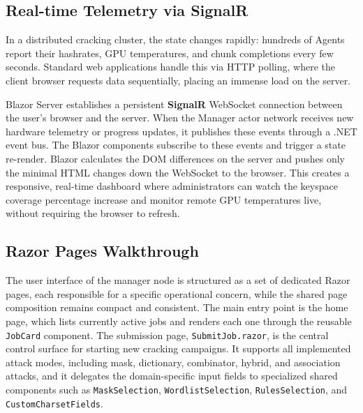 \subsection{Real-time Telemetry via SignalR}
In a distributed cracking cluster, the state changes rapidly: hundreds of Agents report their hashrates, GPU temperatures, and chunk completions every few seconds. Standard web applications handle this via HTTP polling, where the client browser requests data sequentially, placing an immense load on the server.

Blazor Server establishes a persistent \textbf{SignalR} \cite{blazor_signalr} WebSocket connection between the user's browser and the server. When the Manager actor network receives new hardware telemetry or progress updates, it publishes these events through a .NET event bus. The Blazor components subscribe to these events and trigger a state re-render. Blazor calculates the DOM differences on the server and pushes only the minimal HTML changes down the WebSocket to the browser. This creates a responsive, real-time dashboard where administrators can watch the keyspace coverage percentage increase and monitor remote GPU temperatures live, without requiring the browser to refresh.

\subsection{Razor Pages Walkthrough}
The user interface of the manager node is structured as a set of dedicated Razor pages, each responsible for a specific operational concern, while the shared page composition remains compact and consistent. The main entry point is the home page, which lists currently active jobs and renders each one through the reusable \verb|JobCard| component. The submission page, \verb|SubmitJob.razor|, is the central control surface for starting new cracking campaigns. It supports all implemented attack modes, including mask, dictionary, combinator, hybrid, and association attacks, and it delegates the domain-specific input fields to specialized shared components such as \verb|MaskSelection|, \verb|WordlistSelection|, \verb|RulesSelection|, and \verb|CustomCharsetFields|.


